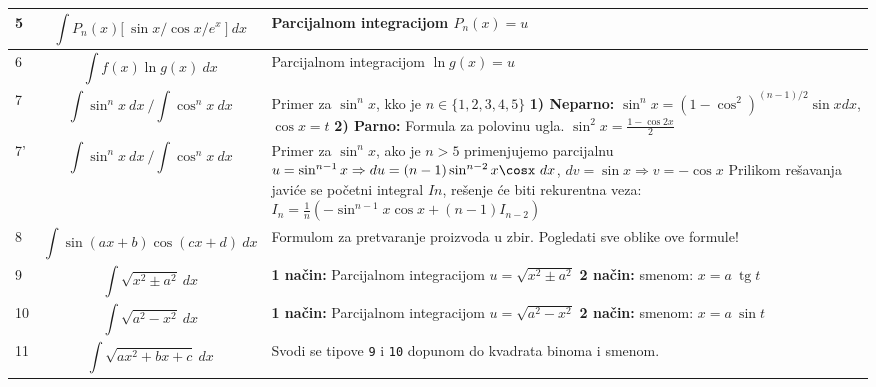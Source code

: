 \documentclass{article}
\DeclareMathOperator{\tg}{tg}
\begin{document}
\begin{tabular}{|I{0.5cm}|p{7.5cm}|R{10cm}|}
		   \vspace{2mm}  5 & \[ \int{P_n(x) [\ \sin x/\cos x/e^x} \ ]\ dx\] & Parcijalnom integracijom $P_n(x) = u$ \\
		\hline
		   \vspace{2mm} 6 & \[ \int{f(x)\ln g(x)\ dx} \] & Parcijalnom integracijom $\ln g(x) = u$ \\
		\hline
		   \vspace{2mm} 7  & \[ \int{\sin^n x\ dx}\ \Big/ \int{\cos^n x\ dx} \] & Primer za $\sin^n x$, kko je $n \in \{1,2,3,4,5\}$ \newline \textbf{1) Neparno:} $\sin^{n}x = (1 - \cos^2)^{(n-1)/2}\sin x dx$, \hspace{1mm} $\cos x = t$ \newline \textbf{2) Parno:} Formula za polovinu ugla. $\sin^2 x = \frac{1-\cos 2x}{2}$\\
		\hline
		   \vspace{3mm} 7'  & \[ \int{\sin^n x\ dx}\ \Big/ \int{\cos^n x\ dx} \] & Primer za $\sin^n x$, ako je $n > 5$ primenjujemo parcijalnu\newline $u = \sin^{n-1}x \Rightarrow du=(n-1)\sin^{n-2}x\cosx \ dx$, $dv = \sin x \Rightarrow v = -\cos x$ \newline Prilikom rešavanja javiće se početni integral $In$, rešenje će biti rekurentna veza: $I_n = \frac{1}{n} (-\sin^{n-1}x\cos x + (n-1)I_{n-2}) $   \\
		\hline
		   \vspace{2mm} 8  & \[ \int{\sin(ax+b)\cos(cx+d)\ dx} \] & Formulom za pretvaranje proizvoda u zbir. \newline Pogledati sve oblike ove formule! \\
		\hline
		   \vspace{2mm} 9  & \[\int{\sqrt{x^2\pm a^2}\ dx} \] & \textbf{1 način:} Parcijalnom integracijom $ u = \sqrt{x^2 \pm a^2} $ \newline \textbf{2 način:} smenom: $x = a\ \tg t$ \\
		\hline
		   \vspace{2mm} 10  & \[\int{\sqrt{a^2 - x^2}\ dx} \] & \textbf{1 način:} Parcijalnom integracijom $ u = \sqrt{a^2 - x^2} $ \newline \textbf{2 način:} smenom: $x = a\ \sin t$ \\
		\hline
		   \vspace{2mm} 11 & \[\int{\sqrt{ax^2+bx+c}}\ dx\] & Svodi se tipove \texttt{9} i \texttt{10} dopunom do kvadrata binoma i smenom. \\

\end{tabular}
\end{document}
